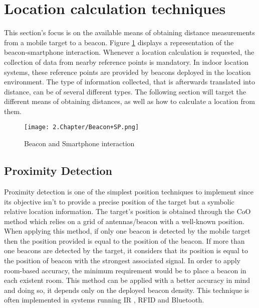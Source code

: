 \section{Location calculation techniques} 
\label{sec:techniques} 
 
 
This section's focus is on the available means of obtaining distance measurements from a mobile target to a beacon. Figure \ref{fig:BeSP} displays a representation of the beacon-smartphone interaction. Whenever a location calculation is requested, the collection of data from nearby reference points is mandatory. In indoor location systems, these reference points are provided by beacons deployed in the location environment. The type of information collected, that is afterwards translated into distance, can be of several different types. The following section will target the different means of obtaining distances, as well as how to calculate a location from them.  

\begin{figure}[H] 
\centering 
\texttt{[image: 2.Chapter/Beacon+SP.png]} 
\caption[Beacon and Smartphone interaction]{Beacon and Smartphone interaction} 
\label{fig:BeSP} 
\end{figure} 

\subsection{Proximity Detection} 
\label{subsec:prox} 
 
 
Proximity detection is one of the simplest position techniques to implement since its objective isn't to provide a precise position of the target but a symbolic relative location information\cite{reviewtechniques}. The target's position is obtained through the \ac{CoO} method which relies on a grid of antennas/beacon with a well-known position. When applying this method, if only one beacon is detected by the mobile target then the position provided is equal to the position of the beacon. If more than one beacons are detected by the target, it considers that its position is equal to the position of beacon with the strongest associated signal. In order to apply room-based accuracy, the minimum requirement would be to place a beacon in each existent room. This method can be applied with a better accuracy in mind and doing so, it depends only on the deployed beacon density. This technique is often implemented in systems running \ac{IR} , \ac{RFID} and Bluetooth. 
 
 

